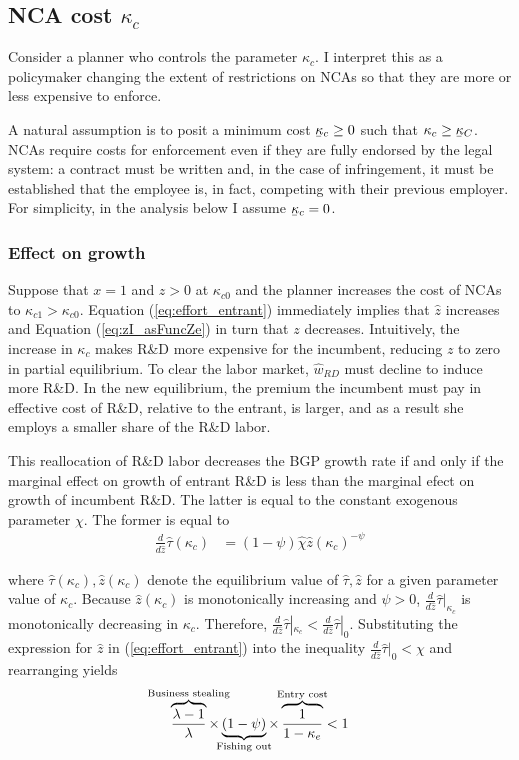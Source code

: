 \documentclass[11pt,english]{article}
\newcommand\munderbar[1]{%
	\underaccent{\bar}{#1}}
\theoremstyle{remark}
\begin{document}
\subsection{NCA cost $\kappa_c$} 

Consider a planner who controls the parameter $\kappa_c$. I interpret this as a policymaker changing the extent of restrictions on NCAs so that they are more or less expensive to enforce. 

A natural assumption is to posit a minimum cost $\munderbar{\kappa}_c \ge 0$ such that $\kappa_c \ge \munderbar{\kappa}_C$. NCAs require costs for enforcement even if they are fully endorsed by the legal system: a contract must be written and, in the case of infringement, it must be established that the employee is, in fact, competing with their previous employer. For simplicity, in the analysis below I assume $\munderbar{\kappa}_c = 0$.

\subsubsection{Effect on growth}

Suppose that $x = 1$ and $z > 0$ at $\kappa_{c0}$ and the planner increases the cost of NCAs to $\kappa_{c1} > \kappa_{c0}$. Equation (\ref{eq:effort_entrant}) immediately implies that $\hat{z}$ increases and Equation (\ref{eq:zI_asFuncZe}) in turn that $z$ decreases. Intuitively, the increase in $\kappa_c$ makes R\&D more expensive for the incumbent, reducing $z$ to zero in partial equilibrium. To clear the labor market, $\hat{w}_{RD}$ must decline to induce more R\&D. In the new equilibrium, the premium the incumbent must pay in effective cost of R\&D, relative to the entrant, is larger, and as a result she employs a smaller share of the R\&D labor.

This reallocation of R\&D labor decreases the BGP growth rate if and only if the marginal effect on growth of entrant R\&D is less than the marginal efect on growth of incumbent R\&D. The latter is equal to the constant exogenous parameter $\chi$. The former is equal to 
\begin{align}
\frac{d}{d\hat{z}} \hat{\tau}(\kappa_c) &= (1-\psi) \hat{\chi} \hat{z} (\kappa_c)^{-\psi} \label{eq:marginal_effect_effort_entrant}
\end{align}

where $\hat{\tau}(\kappa_c), \hat{z}(\kappa_c)$ denote the equilibrium value of $\hat{\tau}, \hat{z}$ for a given parameter value of $\kappa_c$. Because $\hat{z}(\kappa_c)$ is monotonically increasing and $\psi > 0$, $\frac{d}{d\hat{z}} \hat{\tau} |_{\kappa_c}$ is monotonically decreasing in $\kappa_c$. Therefore, $\frac{d}{d\hat{z}}\hat{\tau} |_{\kappa_c} < \frac{d}{d\hat{z}}\hat{\tau}|_0$. Substituting the expression for $\hat{z}$ in (\ref{eq:effort_entrant}) into the inequality $\frac{d}{d\hat{z}}\hat{\tau} |_{0}< \chi$ and rearranging yields 
\begin{align}
\overbrace{\frac{\lambda-1}{\lambda}}^{\mathclap{\text{Business stealing}}} \times \underbrace{(1-\psi)}_{\mathclap{\text{Fishing out}}} \times  \overbrace{\frac{1}{1-\kappa_{e}}}^{\mathclap{\text{Entry cost}}}< 1 \label{cs:growth_decreasing_condition}
\end{align}
\end{document}
